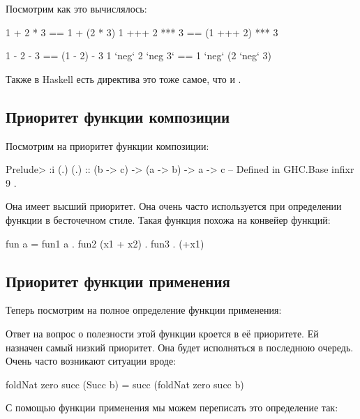 Посмотрим как это вычислялось:


\begin{code}
1   +   2   *  3  ==   1   +   (2    *   3)
1  +++  2  *** 3  ==  (1  +++   2)  ***  3

1   -   2   -  3  ==  (1   -    2)   -   3
1 `neg` 2 `neg 3` ==   1 `neg` (2  `neg` 3)
\end{code}

Также в Haskell есть директива  это тоже самое, что и
.

\subsection{Приоритет функции композиции}

Посмотрим на приоритет функции композиции:


\begin{code}
Prelude> :i (.)
(.) :: (b -> c) -> (a -> b) -> a -> c 	-- Defined in GHC.Base
infixr 9 .
\end{code}

Она имеет высший приоритет. Она очень часто используется при определении
функции в бесточечном стиле. Такая функция похожа на конвейер функций:


\begin{code}
fun a = fun1 a . fun2 (x1 + x2) . fun3 . (+x1) 
\end{code}

\subsection{Приоритет функции применения}

Теперь посмотрим на полное определение функции применения:



Ответ на вопрос о полезности этой функции кроется в её приоритете. Ей
назначен самый низкий приоритет. Она будет исполняться в последнюю
очередь. Очень часто возникают ситуации вроде:


\begin{code}
foldNat zero succ (Succ b) = succ (foldNat zero succ b)
\end{code}

С помощью функции применения мы можем переписать это определение так:


